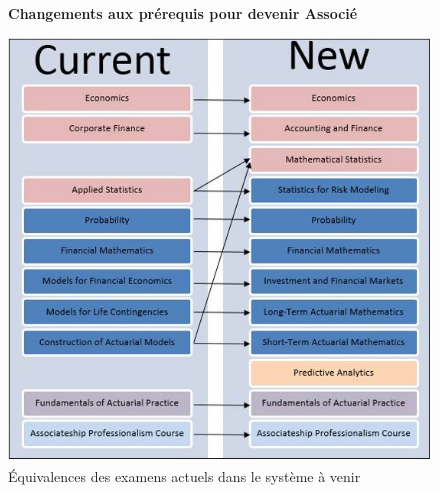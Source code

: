 \begin{figure}[hp]
\begin{center}
\textbf{Changements aux prérequis pour devenir Associé}\par\medskip
\end{center}
\hfill\includegraphics{Change_ASA}\hspace*{\fill}
\caption{Équivalences des examens actuels dans le système à venir}
\end{figure}
\par

\newpage